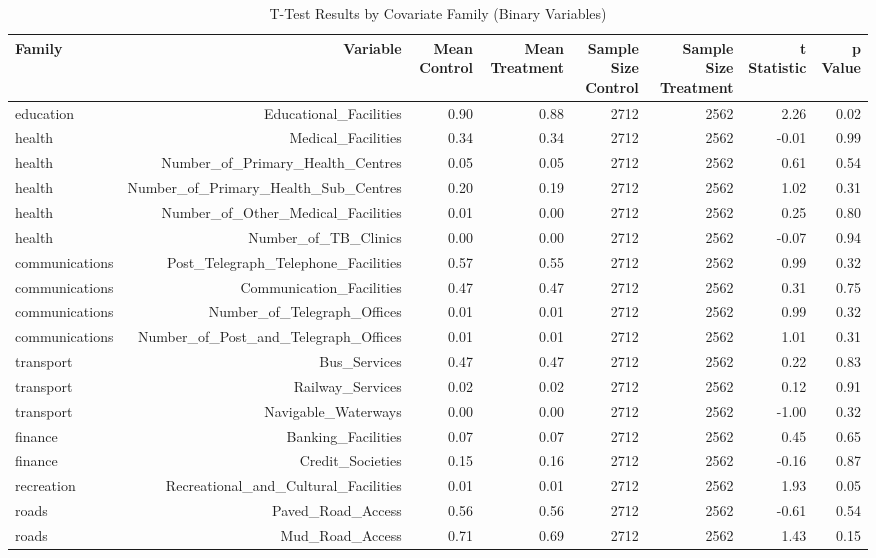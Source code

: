 \begin{table}[ht]
\centering
\caption{T-Test Results by Covariate Family (Binary Variables)} 
\label{tab:t_tests_bin}
\begin{tabular}{lrrrrrrr}
  \hline
Family & Variable & Mean Control & Mean Treatment & Sample Size Control & Sample Size Treatment & t Statistic & p Value \\ 
  \hline
education & Educational_Facilities & 0.90 & 0.88 & 2712 & 2562 & 2.26 & 0.02 \\ 
  health & Medical_Facilities & 0.34 & 0.34 & 2712 & 2562 & -0.01 & 0.99 \\ 
  health & Number_of_Primary_Health_Centres & 0.05 & 0.05 & 2712 & 2562 & 0.61 & 0.54 \\ 
  health & Number_of_Primary_Health_Sub_Centres & 0.20 & 0.19 & 2712 & 2562 & 1.02 & 0.31 \\ 
  health & Number_of_Other_Medical_Facilities & 0.01 & 0.00 & 2712 & 2562 & 0.25 & 0.80 \\ 
  health & Number_of_TB_Clinics & 0.00 & 0.00 & 2712 & 2562 & -0.07 & 0.94 \\ 
  communications & Post_Telegraph_Telephone_Facilities & 0.57 & 0.55 & 2712 & 2562 & 0.99 & 0.32 \\ 
  communications & Communication_Facilities & 0.47 & 0.47 & 2712 & 2562 & 0.31 & 0.75 \\ 
  communications & Number_of_Telegraph_Offices & 0.01 & 0.01 & 2712 & 2562 & 0.99 & 0.32 \\ 
  communications & Number_of_Post_and_Telegraph_Offices & 0.01 & 0.01 & 2712 & 2562 & 1.01 & 0.31 \\ 
  transport & Bus_Services & 0.47 & 0.47 & 2712 & 2562 & 0.22 & 0.83 \\ 
  transport & Railway_Services & 0.02 & 0.02 & 2712 & 2562 & 0.12 & 0.91 \\ 
  transport & Navigable_Waterways & 0.00 & 0.00 & 2712 & 2562 & -1.00 & 0.32 \\ 
  finance & Banking_Facilities & 0.07 & 0.07 & 2712 & 2562 & 0.45 & 0.65 \\ 
  finance & Credit_Societies & 0.15 & 0.16 & 2712 & 2562 & -0.16 & 0.87 \\ 
  recreation & Recreational_and_Cultural_Facilities & 0.01 & 0.01 & 2712 & 2562 & 1.93 & 0.05 \\ 
  roads & Paved_Road_Access & 0.56 & 0.56 & 2712 & 2562 & -0.61 & 0.54 \\ 
  roads & Mud_Road_Access & 0.71 & 0.69 & 2712 & 2562 & 1.43 & 0.15 \\ 

\end{tabular}
\end{table}
